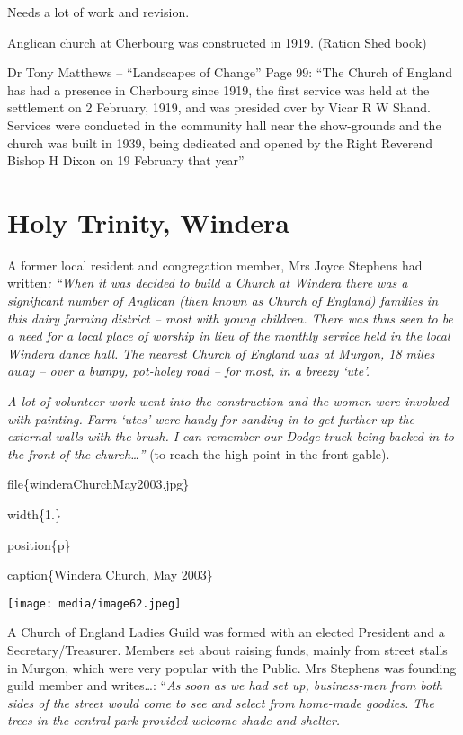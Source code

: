 Needs a lot of work and revision.

Anglican church at Cherbourg was constructed in 1919. (Ration Shed book)

Dr Tony Matthews -- ``Landscapes of Change'' Page 99: ``The Church of England has had a presence in Cherbourg since 1919, the first service was held at the settlement on 2 February, 1919, and was presided over by Vicar R W Shand. Services were conducted in the community hall near the show-grounds and the church was built in 1939, being dedicated and opened by the Right Reverend Bishop H Dixon on 19 February that year''

\hypertarget{holy-trinity-windera}{%
\section{Holy Trinity, Windera}\label{holy-trinity-windera}}

A former local resident and congregation member, Mrs Joyce Stephens had written\emph{: ``When it was decided to build a Church at Windera there was a significant number of Anglican (then known as Church of England) families in this dairy farming district -- most with young children. There was thus seen to be a need for a local place of worship in lieu of the monthly service held in the local Windera dance hall. The nearest Church of England was at Murgon, 18 miles away -- over a bumpy, pot-holey road -- for most, in a breezy `ute'.}

\emph{A lot of volunteer work went into the construction and the women were involved with painting. Farm `utes' were handy for sanding in to get further up the external walls with the brush. I can remember our Dodge truck being backed in to the front of the church\ldots''} (to reach the high point in the front gable).

file\{winderaChurchMay2003.jpg\}

width\{1.\}

position\{p\}

caption\{Windera Church, May 2003\}

\texttt{[image: media/image62.jpeg]}

A Church of England Ladies Guild was formed with an elected President and a Secretary/Treasurer. Members set about raising funds, mainly from street stalls in Murgon, which were very popular with the Public. Mrs Stephens was founding guild member and writes\ldots: ``\emph{As soon as we had set up, business-men from both sides of the street would come to see and select from home-made goodies. The trees in the central park provided welcome shade and shelter.}

